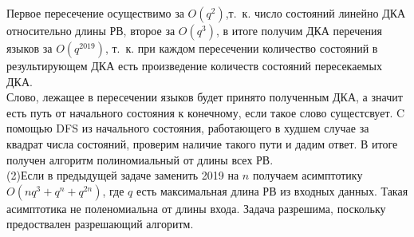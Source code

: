 \documentclass[a4paper,12pt]{article} %
\begin{document}
Первое пересечение осуществимо за $O(q^2)$,т.~к. число состояний линейно ДКА относительно длины РВ, второе за $O(q^3)$, в итоге получим ДКА перечения языков за $O(q^{2019})$, т.~к. при каждом пересечении количество состояний в результирующем ДКА есть произведение количеств состояний пересекаемых ДКА.\\
Слово, лежащее в пересечении языков будет принято полученным ДКА, а значит есть путь от начального состояния к конечному, если такое слово сущестсвует. C помощью DFS из начального состояния, работающего в худшем случае за квадрат числа состояний, проверим наличие такого пути и дадим ответ. В итоге получен алгоритм полиномиальный от длины всех РВ.\\

(2)Если в предыдущей задаче заменить 2019  на $n$ получаем асимптотику $O(nq^3+q^n+q^{2n})$, где $q$ есть максимальная длина РВ из входных данных. Такая асимптотика не поленомиальна от длины входа. Задача разрешима, поскольку предоствален разрешающий алгоритм.\\ 
\end{document}
